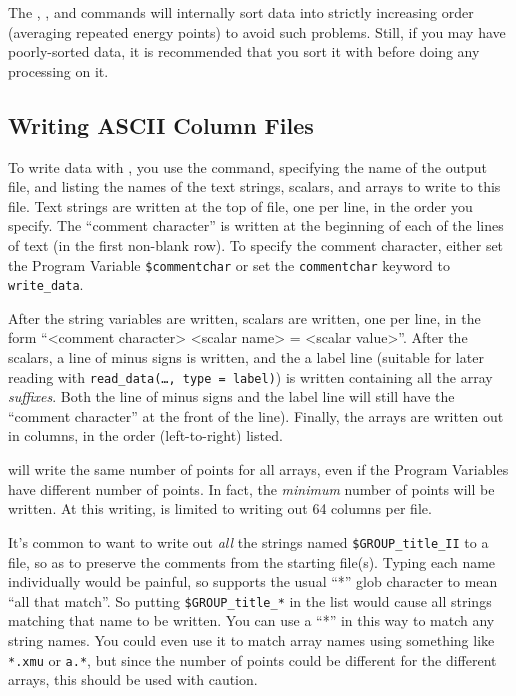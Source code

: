 {}
{}
{}
{}

The {}, {}, and {} commands will
internally sort {\muE} data into strictly increasing order (averaging
repeated energy points) to avoid such problems.  Still, if you may have
poorly-sorted data, it is recommended that you sort it with
{} before doing any processing on it.


\subsection{Writing ASCII Column Files} \label{Ch:IO-WRITE}

To write data with {\ifeffit}, you use the {} command,
specifying the name of the output file, and listing the names of the text
strings, scalars, and arrays to write to this file.  Text strings are
written at the top of file, one per line, in the order you specify.  The
``comment character'' is written at the beginning of each of the lines of
text (in the first non-blank row).  To specify the comment character,
either set the Program Variable {\texttt{\$commentchar}} or set the
{\texttt{commentchar}} keyword to {\texttt{write\_data}}.
{} {}

After the string variables are written, scalars are written, one per line,
in the form ``<comment character> <scalar name> = <scalar value>''.  After
the scalars, a line of minus signs is written, and the a label line
(suitable for later reading with {\tt{read\_data(\ldots, type = label)}})
is written containing all the array {\emph{suffixes}}.  Both the line of
minus signs and the label line will still have the ``comment character'' at
the front of the line).  Finally, the arrays are written out in columns, in
the order (left-to-right) listed.  {}

{} will write the same number of points for all arrays,
even if the Program Variables have different number of points.  In fact,
the \emph{minimum} number of points will be written.    At this writing, 
{} is limited to writing out 64 columns per file.

It's common to want to write out {\emph{all}} the strings named
{\tt{\$GROUP\_title\_II}} to a file, so as to preserve the comments from
the starting file(s).  Typing each name individually would be painful, so
{} supports the usual ``*'' glob character to mean ``all
that match''.  So putting {\tt{\$GROUP\_title\_*}} in the list would cause
all strings matching that name to be written.  You can use a ``*'' in this
way to match any string names.  You could even use it to match array names
using something like {\tt{*.xmu}} or {\tt{a.*}}, but since the number of
points could be different for the different arrays, this should be used
with caution.


